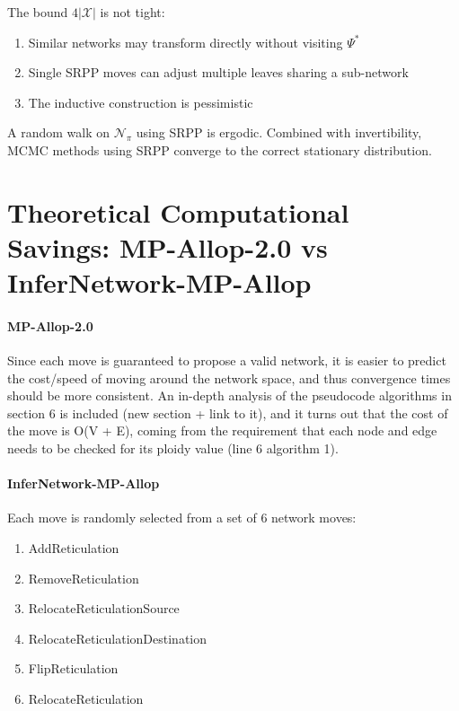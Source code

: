 \documentclass{article}
\begin{document}
\begin{remark}
The bound $4|\mathcal{X}|$ is not tight:
\begin{enumerate}
    \item Similar networks may transform directly without visiting $\Psi^*$
    \item Single SRPP moves can adjust multiple leaves sharing a sub-network
    \item The inductive construction is pessimistic
\end{enumerate}
\end{remark}

\begin{corollary}[Ergodicity]
A random walk on $\mathcal{N}_\pi$ using SRPP is ergodic. Combined with invertibility, MCMC methods using SRPP converge to the correct stationary distribution.
\end{corollary}


\section{Theoretical Computational Savings: MP-Allop-2.0 vs InferNetwork-MP-Allop}

\paragraph{\color{bluem}MP-Allop-2.0} Since each move is guaranteed to propose a valid network, it is easier to predict the cost/speed of moving around the network space, and thus convergence times should be more consistent. An in-depth analysis of the pseudocode algorithms in section 6 is included (new section + link to it), and it turns out that the cost of the move is O(V + E), coming from the requirement that each node and edge needs to be checked for its ploidy value (line 6 algorithm 1). 

\paragraph{\color{bluem} InferNetwork-MP-Allop} Each move is randomly selected from a set of 6 network moves:
\begin{enumerate}
    \item AddReticulation
    \item RemoveReticulation
    \item RelocateReticulationSource
    \item RelocateReticulationDestination
    \item FlipReticulation
    \item RelocateReticulation
\end{enumerate}
\end{document}
